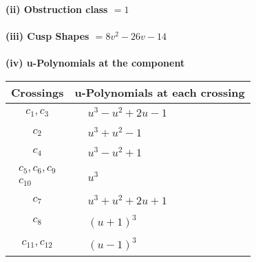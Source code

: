 \documentclass[1p]{elsarticle_modified}
\theoremstyle{definition}
\begin{document}
\flushleft \textbf{(ii) Obstruction class $= 1$}\\~\\
\flushleft \textbf{(iii) Cusp Shapes $= 8 v^2-26 v-14$}\\~\\
\newpage\renewcommand{\arraystretch}{1}
\flushleft \textbf{(iv) u-Polynomials at the component}\newline \\
\begin{tabular}{m{50pt}|m{274pt}}
Crossings & \hspace{64pt}u-Polynomials at each crossing \\
\hline $$\begin{aligned}c_{1},c_{3}\end{aligned}$$&$\begin{aligned}
&u^3- u^2+2 u-1
\end{aligned}$\\
\hline $$\begin{aligned}c_{2}\end{aligned}$$&$\begin{aligned}
&u^3+u^2-1
\end{aligned}$\\
\hline $$\begin{aligned}c_{4}\end{aligned}$$&$\begin{aligned}
&u^3- u^2+1
\end{aligned}$\\
\hline $$\begin{aligned}c_{5},c_{6},c_{9}\\c_{10}\end{aligned}$$&$\begin{aligned}
&u^3
\end{aligned}$\\
\hline $$\begin{aligned}c_{7}\end{aligned}$$&$\begin{aligned}
&u^3+u^2+2 u+1
\end{aligned}$\\
\hline $$\begin{aligned}c_{8}\end{aligned}$$&$\begin{aligned}
&(u+1)^3
\end{aligned}$\\
\hline $$\begin{aligned}c_{11},c_{12}\end{aligned}$$&$\begin{aligned}
&(u-1)^3
\end{aligned}$\\
\hline
\end{tabular}\\~\\
\end{document}

